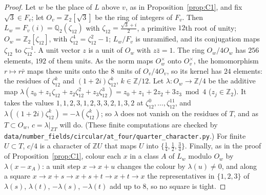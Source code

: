 \documentclass[11pt,a4paper]{amsart}
\theoremstyle{remark}
\newcommand{\Q}{\mathbb{Q}}
\newcommand{\Z}{\mathbb{Z}}
\begin{document}
\begin{proof}
Let $w$ be the place of $L$ above $v$, as in Proposition~\ref{prop:C1}, and fix $\sqrt3\in F_v$; let
$O_v=\Z_2[\sqrt3]$ be the ring of integers of $F_v$. Then $L_w=F_v(i)=\Q_2(\zeta_{12})$ with
$\zeta_{12}=\frac{\sqrt3+i}2$, a primitive $12$th root of unity; $O_w=\Z_2[\zeta_{12}]$, with
$\zeta_{12}^4=\zeta_{12}^2-1$; $L_w/F_v$ is unramified, and its conjugation maps $\zeta_{12}$ to $\zeta_{12}^{-1}$. A unit
vector $z$ is a unit of $O_w$ with $z\bar z=1$. The ring $O_w/4O_w$ has $256$ elements, $192$ of them units. As the
norm maps $O_w^\times$ onto $O_v^\times$, the homomorphism $r\mapsto r\bar r$ maps these units onto the $8$ units of
$O_v/4O_v$, so its kernel has $24$ elements: the residues of $\zeta_{12}^k$ and $(1+2i)\zeta_{12}^k$,
$k\in\Z/12$. Let $\lambda\colon O_w\to\Z/4$ be the additive map
$\lambda(z_0+z_1\zeta_{12}+z_2\zeta_{12}^2+z_3\zeta_{12}^3)=z_0+z_1+2z_2+3z_3\bmod4$ ($z_j\in\Z_2$). It takes the values
$1,1,2,3,1,2,3,3,2,1,3,2$ at $\zeta_{12}^0,\dots,\zeta_{12}^{11}$, and $\lambda((1+2i)\zeta_{12}^k)=-\lambda(\zeta_{12}^k)$;
so $\lambda$ does not vanish on the residues of $T$, and as $T\subset O_w$, $c=\lambda|_{\Z T}$ will do. (These finite
computations are checked by \nolinkurl{data/number_fields/circular/at_four/quarter_character.py}.) For finite
$U\subset T$, $c/4$ is a character of $\Z U$ that maps $U$ into $\{\frac14,\frac12,\frac34\}$. Finally, as in the
proof of Proposition~\ref{prop:C1}, colour each $x$ in a class $A$ of $L_w$ modulo $O_w$ by $\lambda(x-x_A)$: a unit
step $x\to x+u$ changes the colour by $\lambda(u)\ne0$, and along a square $x\to x+s\to x+s+t\to x+t\to x$ the
representatives in $\{1,2,3\}$ of $\lambda(s)$, $\lambda(t)$, $-\lambda(s)$, $-\lambda(t)$ add up to $8$, so no square is
tight.
\end{proof}
\end{document}
